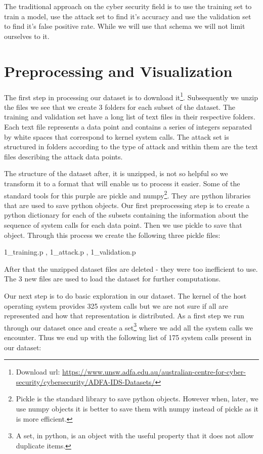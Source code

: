 \documentclass[reqno,openany,12pt]{amsbook}
\begin{document}
The traditional approach on the cyber security field is to use the training set to train a model, use the attack set to find it's accuracy and use the validation set to find it's false positive rate. While we will use that schema we will not limit ourselves to it.


\section{Preprocessing and Visualization}

The first step in processing our dataset is to download it\footnote{Download url: \url{https://www.unsw.adfa.edu.au/australian-centre-for-cyber-security/cybersecurity/ADFA-IDS-Datasets/}}.
Subsequently we unzip the files we see that we create 3 folders for each subset of the dataset. The training and validation set have a long list of text files in their respective folders. Each text file represents a data point and contains a series of integers separated by white spaces that correspond to kernel system calls. The attack set is structured in folders according to the type of attack and within them are the text files describing the attack data points.

The structure of the dataset after, it is unzipped, is not so helpful so we transform it to a format that will enable us to process it easier. Some of the standard tools for this purple are pickle and numpy\footnote{Pickle is the standard library to save python objects. However when, later, we use numpy objects it is better to save them with numpy instead of pickle as it is more efficient.}. They are python libraries that are used to save python objects. Our first preprocessing step is to create a python dictionary for each of the subsets containing the information about the sequence of system calls for each data point. Then we use pickle to save that object. Through this process we create the following three pickle files:
\begin{center}
1\_{}training.p  ,
1\_{}attack.p ,
1\_{}validation.p
\end{center}
After that the unzipped dataset files are deleted - they were too inefficient to use.  The 3 new files are used to load the dataset for further computations.

Our next step is to do basic exploration in our dataset. The kernel of the host operating system provides 325 system calls but we are not sure if all are represented and how that representation is distributed. As a first step we run through our dataset once and create a set\footnote{A set, in python, is an object with the useful property that it does not allow duplicate items.} where we add all the system calls we encounter. Thus we end up with the following list of 175 system calls present in our dataset:
\end{document}
